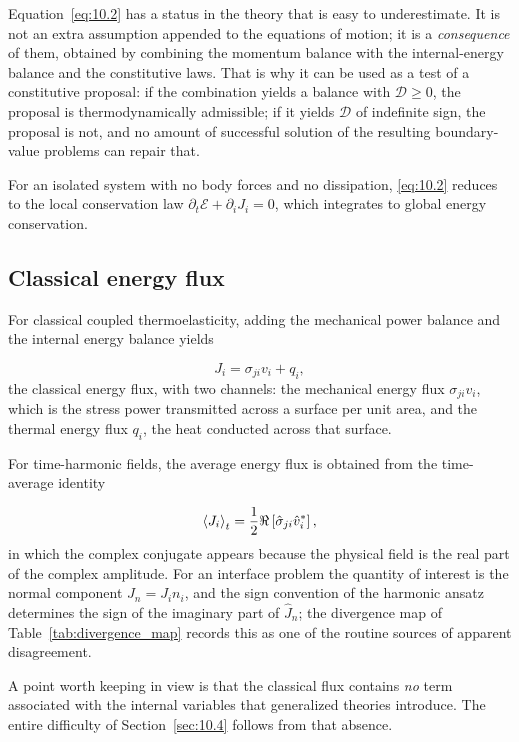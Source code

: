 Equation~\eqref{eq:10.2} has a status in the theory that is easy to underestimate. It is not an extra assumption appended to the equations of motion; it is a \emph{consequence} of them, obtained by combining the momentum balance with the internal-energy balance and the constitutive laws. That is why it can be used as a test of a constitutive proposal: if the combination yields a balance with $\mathcal{D} \geq 0$, the proposal is thermodynamically admissible; if it yields $\mathcal{D}$ of indefinite sign, the proposal is not, and no amount of successful solution of the resulting boundary-value problems can repair that.

For an isolated system with no body forces and no dissipation, \eqref{eq:10.2} reduces to the local conservation law $\partial_t\mathcal{E} + \partial_i J_i = 0$, which integrates to global energy conservation.

\subsection{Classical energy flux}
\label{sec:10.2}

For classical coupled thermoelasticity, adding the mechanical power balance and the internal energy balance yields

\begin{equation}
J_i = \sigma_{ji}v_i + q_i,
\label{eq:10.3}
\end{equation}
the classical energy flux, with two channels: the mechanical energy flux $\sigma_{ji}v_i$, which is the stress power transmitted across a surface per unit area, and the thermal energy flux $q_i$, the heat conducted across that surface.

For time-harmonic fields, the average energy flux is obtained from the time-average identity

\begin{equation}
\left\langle J_i \right\rangle_t = \frac{1}{2}\Re\left[\hat{\sigma}_{ji}\hat{v}_i^*\right],
\label{eq:10.4}
\end{equation}
in which the complex conjugate appears because the physical field is the real part of the complex amplitude. For an interface problem the quantity of interest is the normal component $J_n = J_i n_i$, and the sign convention of the harmonic ansatz determines the sign of the imaginary part of $\hat{J}_n$; the divergence map of Table~\ref{tab:divergence_map} records this as one of the routine sources of apparent disagreement.

A point worth keeping in view is that the classical flux contains \emph{no} term associated with the internal variables that generalized theories introduce. The entire difficulty of Section~\ref{sec:10.4} follows from that absence.

